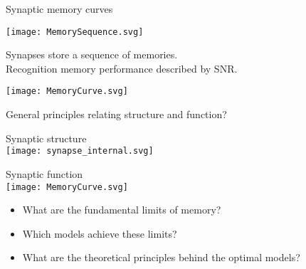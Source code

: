 \documentclass[final]{beamer}%
\begin{document}
\begin{frame}{Synaptic memory curves}
%
 \begin{center}
   \texttt{[image: MemorySequence.svg]}
 \end{center}
 Synapses store a sequence of memories.\\
 Recognition memory performance described by SNR.
 \begin{center}
   {\texttt{[image: MemoryCurve.svg]}}
 \end{center}
%
\end{frame}


\begin{frame}{General principles relating structure and function?}
%
 \vspace{-2\baselineskip}
 \begin{center}
 \parbox[t]{0.35\linewidth}{%
 \begin{center}
   Synaptic structure\\
   \texttt{[image: synapse\_internal.svg]}
 \end{center}
 }
 \hspace{0.1\linewidth}
 \parbox[t]{0.3\linewidth}{%
 \begin{center}
   Synaptic function\\
   \texttt{[image: MemoryCurve.svg]}
 \end{center}
 }
 \end{center}
 \begin{itemize}
   \item What are the fundamental limits of memory?
   \vp\item Which models achieve these limits?
   \vp\item What are the theoretical principles behind the optimal models?
 \end{itemize}
%
\end{frame}
\end{document}
